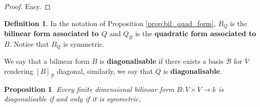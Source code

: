 \documentclass[12pt]{article}
\theoremstyle{plain}
\newtheorem{proposition}[thm]{Proposition}
\theoremstyle{definition}
\newtheorem{defn}[thm]{Definition} %
\newcommand{\scr}[1]{\mathscr{#1}}
\newcommand{\lto}{\longrightarrow}
\begin{document}
	\begin{proof}
		Easy.
	\end{proof}
	\begin{defn}\label{def:associated_forms}
		In the notation of Proposition \ref{prop:bil_quad_form}, $B_Q$ is the \textbf{bilinear form associated to $Q$} and $Q_B$ is the \textbf{quadratic form associated to $B$}. Notice that $B_Q$ is symmetric.
		
		We say that a bilinear form $B$ is \textbf{diagonalisable} if there exists a basis $\scr{B}$ for $V$ rendering $[B]_{\scr{B}}$ diagonal, similarly, we say that $Q$ is \textbf{diagonalisable}.
		
	\end{defn}
	\begin{proposition}\label{prop:diagonalisable_symmetric}
		Every finite dimensional bilinear form $B: V \times V \lto k$ is diagonalisable if and only if it is symmetric.
	\end{proposition}
\end{document}
